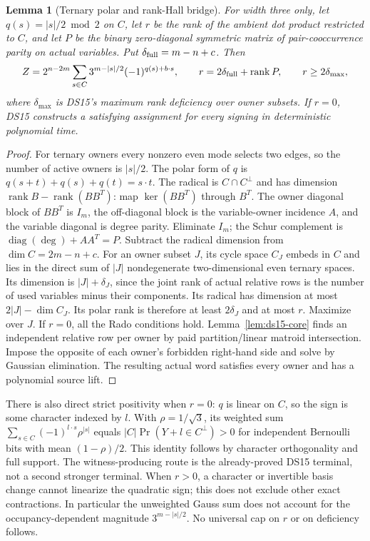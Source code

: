 \documentclass[11pt]{article}
\newtheorem{lemma}[theorem]{Lemma}
\begin{document}
\begin{lemma}[Ternary polar and rank-Hall bridge]\label{lem:i26-polar}
For width three only, let $q(s)=|s|/2\bmod2$ on $C$, let $r$ be the rank of the ambient dot product restricted to $C$, and let $P$ be the binary zero-diagonal symmetric matrix of pair-cooccurrence parity on actual variables. Put $\delta_{\rm full}=m-n+c$. Then
\[
Z=2^{n-2m}\sum_{s\in C}3^{m-|s|/2}(-1)^{q(s)+b\cdot s},\qquad
r=2\delta_{\rm full}+\operatorname{rank}P,\qquad
r\ge2\delta_{\max},
\]
where $\delta_{\max}$ is DS15's maximum rank deficiency over owner subsets. If $r=0$, DS15 constructs a satisfying assignment for every signing in deterministic polynomial time.
\end{lemma}
\begin{proof}
For ternary owners every nonzero even mode selects two edges, so the number of active owners is $|s|/2$. The polar form of $q$ is $q(s+t)+q(s)+q(t)=s\cdot t$. The radical is $C\cap C^\perp$ and has dimension $\operatorname{rank}B-\operatorname{rank}(BB^T)$: map $\ker(BB^T)$ through $B^T$. The owner diagonal block of $BB^T$ is $I_m$, the off-diagonal block is the variable-owner incidence $A$, and the variable diagonal is degree parity. Eliminate $I_m$; the Schur complement is $\operatorname{diag}(\deg)+AA^T=P$. Subtract the radical dimension from $\dim C=2m-n+c$. For an owner subset $J$, its cycle space $C_J$ embeds in $C$ and lies in the direct sum of $|J|$ nondegenerate two-dimensional even ternary spaces. Its dimension is $|J|+\delta_J$, since the joint rank of actual relative rows is the number of used variables minus their components. Its radical has dimension at most $2|J|-\dim C_J$. Its polar rank is therefore at least $2\delta_J$ and at most $r$. Maximize over $J$. If $r=0$, all the Rado conditions hold. Lemma~\ref{lem:ds15-core} finds an independent relative row per owner by paid partition/linear matroid intersection. Impose the opposite of each owner's forbidden right-hand side and solve by Gaussian elimination. The resulting actual word satisfies every owner and has a polynomial source lift.
\end{proof}
There is also direct strict positivity when $r=0$: $q$ is linear on $C$, so the sign is some character indexed by $l$. With $\rho=1/\sqrt3$, its weighted sum $\sum_{s\in C}(-1)^{l\cdot s}\rho^{|s|}$ equals $|C|\Pr(Y+l\in C^\perp)>0$ for independent Bernoulli bits with mean $(1-\rho)/2$. This identity follows by character orthogonality and full support. The witness-producing route is the already-proved DS15 terminal, not a second stronger terminal. When $r>0$, a character or invertible basis change cannot linearize the quadratic sign; this does not exclude other exact contractions. In particular the unweighted Gauss sum does not account for the occupancy-dependent magnitude $3^{m-|s|/2}$. No universal cap on $r$ or on deficiency follows.
\end{document}
